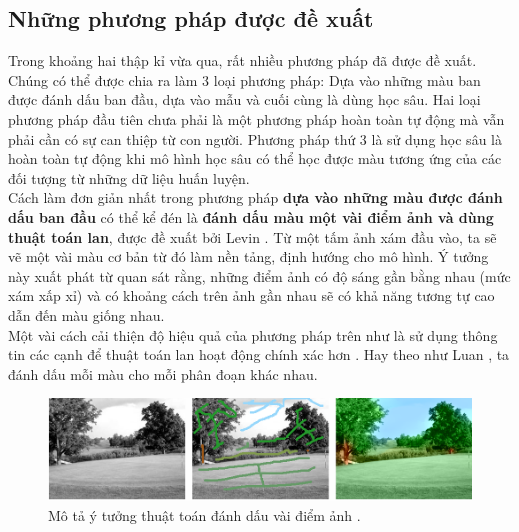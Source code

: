 \documentclass[a4paper, 12pt]{article}
\begin{document}
\subsection{Những phương pháp được đề xuất}
Trong khoảng hai thập kỉ vừa qua, rất nhiều phương pháp đã được đề xuất. Chúng có thể được chia ra làm 3 loại phương pháp: Dựa vào những màu ban được đánh dấu ban đầu, dựa vào mẫu và cuối cùng là dùng học sâu. Hai loại phương pháp đầu tiên chưa phải là một phương pháp hoàn toàn tự động mà vẫn phải cần có sự can thiệp từ con người. Phương pháp thứ 3 là sử dụng học sâu là hoàn toàn tự động khi mô hình học sâu có thể học được màu tương ứng của các đối tượng từ những dữ liệu huấn luyện.\vspace{5pt}\\
Cách làm đơn giản nhất trong phương pháp \textbf{dựa vào những màu được đánh dấu ban đầu} có thể kể đén là \textbf{đánh dấu màu một vài điểm ảnh và dùng thuật toán lan}, được đề xuất bởi Levin \cite{alevincolorization}. Từ một tấm ảnh xám đầu vào, ta sẽ vẽ một vài màu cơ bản từ đó làm nền tảng, định hướng cho mô hình. Ý tưởng này xuất phát từ quan sát rằng, những điểm ảnh có độ sáng gần bằng nhau (mức xám xấp xỉ) và có khoảng cách trên ảnh gần nhau sẽ có khả năng tương tự cao dẫn đến màu giống nhau.\\
Một vài cách cải thiện độ hiệu quả của phương pháp trên như là sử dụng thông tin các cạnh để thuật toán lan hoạt động chính xác hơn \cite{huangcolorization}. Hay theo như Luan \cite{luancolorization}, ta đánh dấu mỗi màu cho mỗi phân đoạn khác nhau. 

\begin{figure}[!h]
\captionsetup{width=0.8\textwidth}
\centering
\includegraphics[width=15cm]{images/2_4.png}
\caption{Mô tả ý tưởng thuật toán đánh dấu vài điểm ảnh \cite{trungcolorization2018}.}
\label{fig:scribblemethod}
\end{figure}
\end{document}

